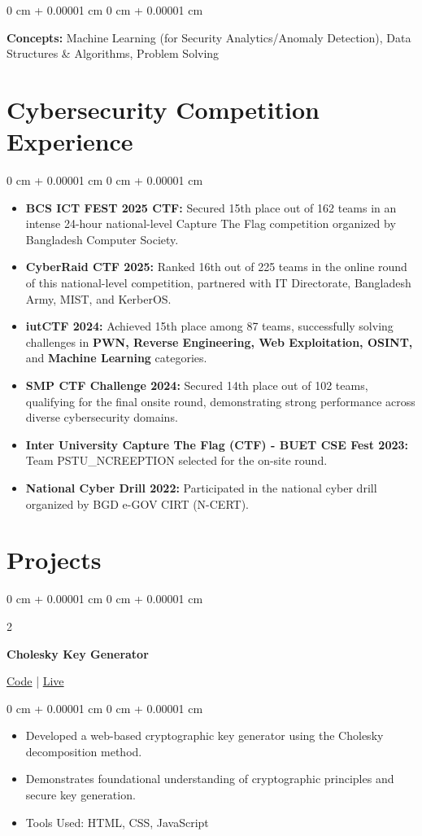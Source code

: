 \documentclass[10pt, letterpaper]{article}
\newenvironment{highlights}{
\begin{itemize}[
topsep=0.10 cm,
parsep=0.10 cm,
partopsep=0pt,
itemsep=0pt,
leftmargin=0 cm + 10pt
]
}{
\end{itemize}
} %
\newenvironment{onecolentry}{
\begin{adjustwidth}{
0 cm + 0.00001 cm
}{
0 cm + 0.00001 cm
}
}{
\end{adjustwidth}
} %
\newenvironment{twocolentry}[2][]{
\onecolentry
\def\secondColumn{#2}
\setcolumnwidth{\fill, 4.5 cm}
\begin{paracol}{2}
}{
\switchcolumn \raggedleft \secondColumn
\end{paracol}
\endonecolentry
} %
\begin{document}
\begin{onecolentry}
	\textbf{Concepts:} Machine Learning (for Security Analytics/Anomaly Detection), Data Structures \& Algorithms, Problem Solving
\end{onecolentry}

\section{Cybersecurity Competition Experience}
\begin{onecolentry}
	\begin{highlights}
		\item \textbf{BCS ICT FEST 2025 CTF:} Secured 15th place out of 162 teams in an intense 24-hour national-level Capture The Flag competition organized by Bangladesh Computer Society.
		\item \textbf{CyberRaid CTF 2025:} Ranked 16th out of 225 teams in the online round of this national-level competition, partnered with IT Directorate, Bangladesh Army, MIST, and KerberOS.
		\item \textbf{iutCTF 2024:} Achieved 15th place among 87 teams, successfully solving challenges in \textbf{PWN, Reverse Engineering, Web Exploitation, OSINT,} and \textbf{Machine Learning} categories.
		\item \textbf{SMP CTF Challenge 2024:} Secured 14th place out of 102 teams, qualifying for the final onsite round, demonstrating strong performance across diverse cybersecurity domains.
		\item \textbf{Inter University Capture The Flag (CTF) - BUET CSE Fest 2023:} Team PSTU\_NCREEPTION selected for the on-site round.
		\item \textbf{National Cyber Drill 2022:} Participated in the national cyber drill organized by BGD e-GOV CIRT (N-CERT).
	\end{highlights}
\end{onecolentry}

\section{Projects}

\begin{twocolentry}
	{\href{https://github.com/ItsTHEAvro/Cholesky-Key-Generator}{Code} | \href{https://itstheavro.github.io/Cholesky-Key-Generator/}{Live}}
	\textbf{Cholesky Key Generator}
\end{twocolentry}

\vspace{0.10 cm}
\begin{onecolentry}
	\begin{highlights}
		\item Developed a web-based cryptographic key generator using the Cholesky decomposition method.
		\item Demonstrates foundational understanding of cryptographic principles and secure key generation.
		\item Tools Used: HTML, CSS, JavaScript
	\end{highlights}
\end{onecolentry}
\end{document}
